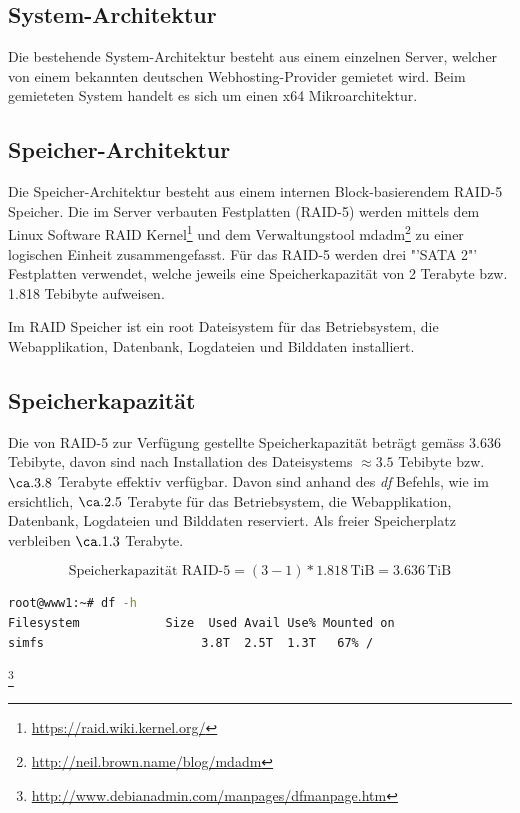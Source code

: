 \subsection{System-Architektur}\label{System-Architektur}
Die bestehende System-Architektur besteht aus einem einzelnen Server, welcher von einem bekannten deutschen Webhosting-Provider gemietet wird. Beim gemieteten System handelt es sich um einen x64 Mikroarchitektur.

\subsection{Speicher-Architektur}
Die Speicher-Architektur besteht aus einem internen Block-basierendem RAID-5 Speicher. Die im Server verbauten Festplatten (RAID-5) werden mittels dem Linux Software RAID Kernel\footnote{\url{https://raid.wiki.kernel.org/}} und dem Verwaltungstool mdadm\footnote{\url{http://neil.brown.name/blog/mdadm}} zu einer logischen Einheit zusammengefasst. Für das RAID-5 werden drei  "'SATA 2"' Festplatten verwendet, welche jeweils eine Speicherkapazität von 2 Terabyte bzw. 1.818 Tebibyte aufweisen.

Im RAID Speicher ist ein root Dateisystem für das Betriebsystem, die Webapplikation, Datenbank, Logdateien und Bilddaten installiert.

\subsection{Speicherkapazität}
Die von RAID-5 zur Verfügung gestellte Speicherkapazität beträgt gemäss  3.636 Tebibyte, davon sind nach Installation des Dateisystems $\approx 3.5$ Tebibyte bzw. $\ca. 3.8 $ Terabyte effektiv verfügbar. Davon sind anhand des \textit{df} Befehls,  wie im ersichtlich, $\ca. 2.5$ Terabyte für das Betriebsystem, die Webapplikation, Datenbank, Logdateien und Bilddaten reserviert. Als freier Speicherplatz verbleiben $\ca. 1.3$ Terabyte.

\begin{equation}
\mbox{Speicherkapazität RAID-5}= (3 - 1) * 1.818  \, \mathrm{TiB} =  3.636 \, \mathrm{TiB}
\label{eqn:RAID-5-3disk}
\end{equation}

\begin{lstlisting}[label=df, language=Bash, caption=Report Dateisystem Speicherplatz Belegung in Dezimal Prefix ]
root@www1:~# df -h
Filesystem            Size  Used Avail Use% Mounted on
simfs                      3.8T  2.5T  1.3T   67% /
\end{lstlisting}
\footnote{\url{http://www.debianadmin.com/manpages/dfmanpage.htm}}

